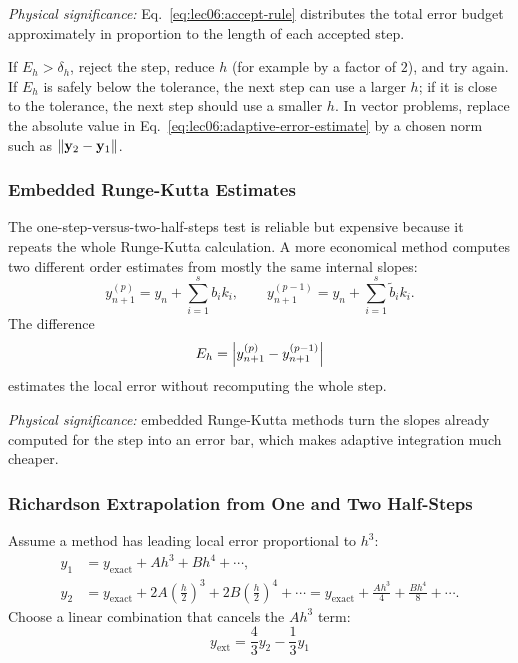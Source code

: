 \textit{Physical significance:} Eq.~\eqref{eq:lec06:accept-rule} distributes
the total error budget approximately in proportion to the length of each
accepted step.

If $E_h>\delta_h$, reject the step, reduce $h$ (for example by a factor of
$2$), and try again. If $E_h$ is safely below the tolerance, the next step
can use a larger $h$; if it is close to the tolerance, the next step should
use a smaller $h$. In vector problems, replace the absolute value in
Eq.~\eqref{eq:lec06:adaptive-error-estimate} by a chosen norm such as
$\left\lVert\mathbf{y}_2-\mathbf{y}_1\right\rVert$.

\subsubsection{Embedded Runge-Kutta Estimates}
The one-step-versus-two-half-steps test is reliable but expensive because it
repeats the whole Runge-Kutta calculation. A more economical method computes
two different order estimates from mostly the same internal slopes:
\begin{equation}
    y_{n+1}^{(p)}
    =y_n+\sum_{i=1}^{s} b_i k_i,
    \qquad
    y_{n+1}^{(p-1)}
    =y_n+\sum_{i=1}^{s} \tilde b_i k_i.
    \label{eq:lec06:embedded-rk}
\end{equation}
The difference
\begin{equation}
    E_h=\left|y_{n+1}^{(p)}-y_{n+1}^{(p-1)}\right|
    \label{eq:lec06:embedded-error}
\end{equation}
estimates the local error without recomputing the whole step.

\textit{Physical significance:} embedded Runge-Kutta methods turn the slopes
already computed for the step into an error bar, which makes adaptive
integration much cheaper.

\subsubsection{Richardson Extrapolation from One and Two Half-Steps}
Assume a method has leading local error proportional to $h^3$:
\begin{align}
    y_1 &= y_{\mathrm{exact}}+A h^3+B h^4+\cdots,
    \label{eq:lec06:richardson-one}\\
    y_2 &= y_{\mathrm{exact}}+2A\left(\frac{h}{2}\right)^3
          +2B\left(\frac{h}{2}\right)^4+\cdots
    =y_{\mathrm{exact}}+\frac{A h^3}{4}+\frac{B h^4}{8}+\cdots.
    \label{eq:lec06:richardson-two}
\end{align}
Choose a linear combination that cancels the $A h^3$ term:
\begin{equation}
    \boxed{
    y_{\mathrm{ext}}
    =\frac{4}{3}y_2-\frac{1}{3}y_1}
    \label{eq:lec06:richardson-result}
\end{equation}

